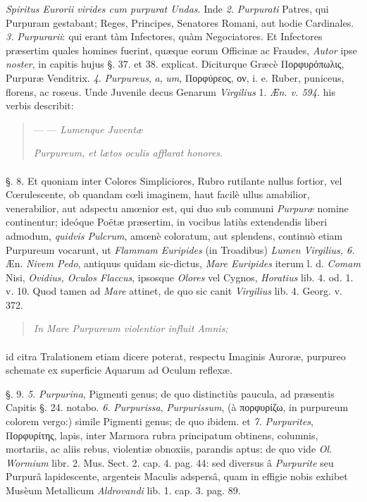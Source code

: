 \documentclass[a4paper, 11pt, oneside, polutonikogreek, german]{article}
\begin{document}
\emph{Spiritus Eurorii virides cum purpurat Undas}. Inde \emph{2.} \emph{Purpurati} Patres, qui Purpuram gestabant; Reges, Principes, Senatores Romani, aut hodie Cardinales. \emph{3.} \emph{Purpurarii}: qui erant tàm Infectores, quàm Negociatores. Et Infectores præsertim quales homines fuerint, quæque eorum Officinæ ac Fraudes, \emph{Autor} ipse \emph{noster}, in capitis hujus §. 37. et 38. explicat. Diciturque Græcè Πορφυρόπωλις, Purpuræ Venditrix. \emph{4.} \emph{Purpureus}, \emph{a}, \emph{um}, Πορφύρεος, ον, i. e. Ruber, puniceus, florens, ac roseus. Unde Juvenile decus Genarum \emph{Virgilius} 1. \emph{Æn. v. 594.} his verbis describit:
\begin{quotation}
--- --- \emph{Lumenque Juventæ}

\emph{Purpureum, et lætos oculis afflarat honores}.
\end{quotation}
\paragraph{}
§. 8. Et quoniam inter Colores Simpliciores, Rubro rutilante nullus fortior, vel Cœrulescente, ob quandam cœli imaginem, haut facilè ullus amabilior, venerabilior, aut adspectu amœnior est, qui duo sub communi \emph{Purpuræ} nomine continentur; ideóque Poëtæ præsertim, in vocibus latiùs extendendis liberi admodum, \emph{quidvis Pulcrum}, amœnè coloratum, aut splendens, continuò etiam Purpureum vocarunt, ut \emph{Flammam Euripides} (in Troadibus) \emph{Lumen Virgilius, 6.} Æn. \emph{Nivem Pedo}, antiquus quidam sic-dictus, \emph{Mare Euripides} iterum l. d. \emph{Comam} Nisi, \emph{Ovidius, Oculos Flaccus}, ipsosque \emph{Olores} vel Cygnos, \emph{Horatius} lib. 4. od. 1. v. 10. Quod tamen ad \emph{Mare} attinet, de quo sic canit \emph{Virgilius} lib. 4. Georg. v. 372.
\begin{quotation}
\emph{In Mare Purpureum violentior influit Amnis;}
\end{quotation}
\paragraph{}
id citra Tralationem etiam dicere poterat, respectu Imaginis Auroræ, purpureo schemate ex superficie Aquarum ad Oculum reflexæ.

§. 9. \emph{5.} \emph{Purpurina}, Pigmenti genus; de quo distinctiùs paucula, ad præsentis Capitis §. 24. notabo. \emph{6.} \emph{Purpurissa}, \emph{Purpurissum}, (à πορφυρίζω, in purpureum colorem vergo:) simile Pigmenti genus; de quo ibidem. et \emph{7.} \emph{Purpurites}, Πορφυρίτης, lapis, inter Marmora rubra principatum obtinens, columnis, mortariis, ac aliis rebus, violentiæ obnoxiis, parandis aptus: de quo vide \emph{Ol. Wormium} libr. 2. Mus. Sect. 2. cap. 4. pag. 44: sed diversus â \emph{Purpurite} seu Purpurâ lapidescente, argenteis Maculis adspersâ, quam in effigie nobis exhibet Musèum Metallicum \emph{Aldrovandi} lib. 1. cap. 3. pag. 89.
\end{document}

